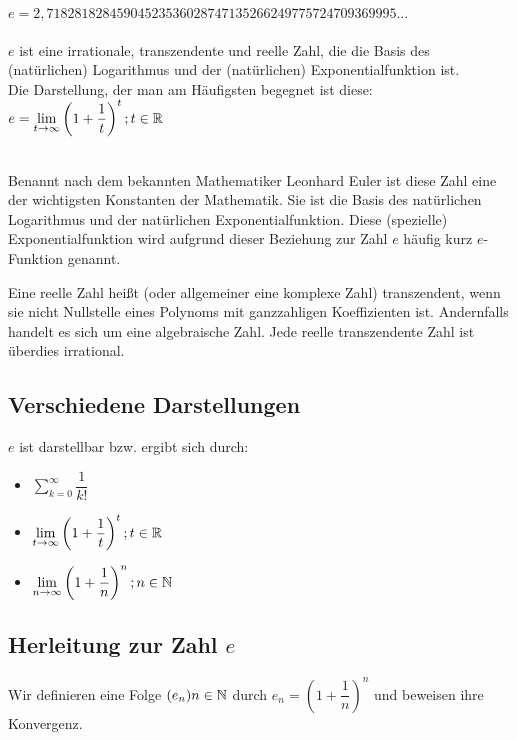 \begin{Definition}
$e = 2,71828182845904523536028747135266249775724709369995...$\\
\\
$e$ ist eine irrationale, transzendente und reelle Zahl, die die Basis des (natürlichen) Logarithmus und der (natürlichen) Exponentialfunktion ist.\\
Die Darstellung, der man am Häufigsten begegnet ist diese:
$e=\lim\limits_{t\to \infty}\left(1+\dfrac{1}{t}\right)^t;t\in\mathbb{R}$
\end{Definition}
\\
Benannt nach dem bekannten Mathematiker Leonhard Euler ist diese Zahl eine der wichtigsten Konstanten der Mathematik.
Sie ist die Basis des natürlichen Logarithmus und der natürlichen Exponentialfunktion. Diese (spezielle) Exponentialfunktion wird aufgrund dieser Beziehung zur Zahl $e$ häufig kurz $e$-Funktion genannt.\\
\begin{Definition}
  Eine reelle Zahl heißt (oder allgemeiner eine komplexe Zahl) transzendent,
  wenn sie nicht Nullstelle eines Polynoms mit ganzzahligen Koeffizienten ist.
  Andernfalls handelt es sich um eine algebraische Zahl. Jede reelle transzendente Zahl ist überdies irrational.
\end{Definition}

	\subsection{Verschiedene Darstellungen}

$e$ ist darstellbar bzw. ergibt sich durch:
\begin{itemize}
\item $\sum\limits_{k=0}^{\infty}\dfrac{1}{k!}$
\item $\lim\limits_{t\to \infty}\left(1+\dfrac{1}{t}\right)^t;t\in\mathbb{R}$
\item $\lim\limits_{n\to \infty}\left(1+\dfrac{1}{n}\right)^n;n\in\mathbb{N}$
\end{itemize}

	\subsection{Herleitung zur Zahl $e$}

Wir definieren eine Folge $(e_{n})n\in\mathbb{N}$ durch $e_{n}=\left(1+\dfrac{1}{n}\right)^n$ und beweisen ihre Konvergenz.

